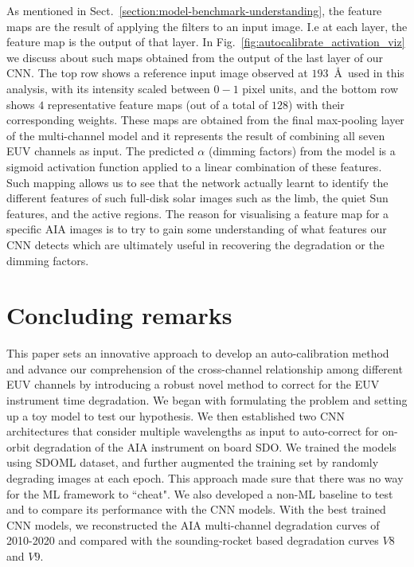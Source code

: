 \documentclass{aa}
\begin{document}
As mentioned in Sect.~\ref{section:model-benchmark-understanding}, the feature maps are the result of applying the filters to an input image. I.e at each layer, the feature map is the output of that layer. In Fig.~\ref{fig:autocalibrate_activation_viz} we discuss about such maps obtained from the output of the last layer of our CNN. The top row shows a reference input image observed at $193$~\AA\ used in this analysis, with its intensity scaled between $0-1$ pixel units, and the bottom row shows $4$ representative feature maps (out of a total of $128$) with their corresponding weights. These maps are obtained from the final max-pooling layer of the multi-channel model and it represents the result of combining all seven EUV channels as input. The predicted $\alpha$ (dimming factors) from the model is a sigmoid activation function applied to a linear combination of these features. Such mapping allows us to see that the network actually learnt to identify the different features of such full-disk solar images such as the limb, the quiet Sun features, and the active regions. The reason for visualising a feature map for a specific AIA images is to try to gain some understanding of what features our CNN detects which are ultimately useful in recovering the degradation or the dimming factors.

\section{Concluding remarks}
\label{section:summary}
This paper sets an innovative approach to develop an auto-calibration method and advance our comprehension of the cross-channel relationship among different EUV channels by introducing a robust novel method to correct for the EUV instrument time degradation. We began with formulating the problem and setting up a toy model to test our hypothesis. We then established two CNN architectures that consider multiple wavelengths as input to auto-correct for on-orbit degradation of the AIA instrument on board SDO. We trained the models using SDOML dataset, and further augmented the training set by randomly degrading images at each epoch. This approach made sure that there was no way for the ML framework to ``cheat". We also developed a non-ML baseline to test and to compare its performance with the CNN models. With the best trained CNN models, we reconstructed the AIA multi-channel degradation curves of 2010-2020 and compared with the sounding-rocket based degradation curves $V8$ and $V9$.
\end{document}
